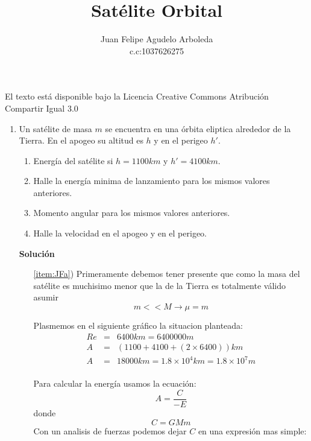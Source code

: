 \documentclass[12pt]{article}
\title{Satélite Orbital}
\author{Juan Felipe Agudelo Arboleda \\c.c:1037626275}
\begin{document}
\maketitle


El texto está disponible bajo la Licencia Creative Commons Atribución Compartir Igual 3.0
\begin{enumerate} 

\item Un satélite de masa $m$ se encuentra en una órbita eliptica alrededor de la Tierra. En el apogeo su altitud es $h$ y en el perigeo $h'$. 
  \begin{minipage}{0.6\linewidth}
    \begin{enumerate}
    \item Energía del satélite si $h=1100 km$ y $h'=4100 km$.
      \label{item:JFa}
    \item Halle la energía minima de lanzamiento para los mismos valores anteriores.
      \label{item:JFb}
      \item Momento angular para los mismos valores anteriores.
      \label{item:JFc}    
     \item Halle la velocidad en el apogeo y en el perigeo.
      \label{item:JFd}
    \end{enumerate}
  \end{minipage}
  
  \textbf{Solución}
  \begin{itemize}  
  
  \item[\ref{item:JFa})]
  Primeramente debemos tener presente que como la masa del satélite es muchisimo menor que la de la Tierra es totalmente válido asumir
\begin{equation} 
m<<M\rightarrow\mu=m\nonumber
\end{equation}

Plasmemos en el siguiente gráfico la situacion planteada:\\

  \begin{eqnarray}
  Re&=&6400 km=6400000 m\nonumber\\ 
  A&=&(1100+4100+(2\times6400)) km\nonumber\\
  A&=&18000  km = 1.8\times10^4 km = 1.8\times10^7 m\\
   \nonumber
 \end{eqnarray}
 
 Para calcular la energía usamos la ecuación:
\begin{equation}
A=\frac{C}{-E}\nonumber
\end{equation}
donde
\begin{equation}
C=G M m\nonumber
\end{equation} 
Con un analisis de fuerzas podemos dejar $C$ en una expresión mas simple:\\
\begin{center}



\end{center}
\end{itemize}
\end{enumerate}
\end{document}
